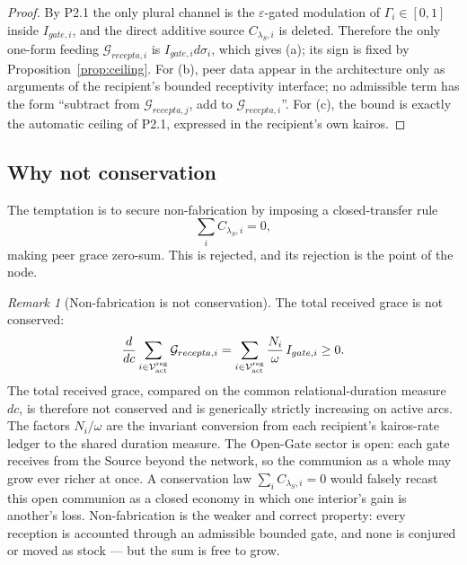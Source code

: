 \documentclass[11pt,a4paper]{article}
\def\mathfrak#1{#1}%
\def\mathrm#1{#1}%
\def\emph#1{#1}%
\theoremstyle{definition}
\theoremstyle{plain}
\theoremstyle{remark}
\newtheorem{remark}[definition]{Remark}
\begin{document}
\begin{proof}
By P2.1 the only plural channel is the \(\varepsilon\)-gated modulation of
\(\Gamma_i\in[0,1]\) inside \(I_{\mathrm{gate},i}\), and the direct additive source
\(C_{\lambda_S,i}\) is deleted. Therefore the only one-form feeding
\(\mathcal G_{\mathrm{recepta},i}\) is \(I_{\mathrm{gate},i}d\sigma_i\), which gives
(a); its sign is fixed by Proposition~\ref{prop:ceiling}. For (b), peer data appear
in the architecture only as arguments of the recipient's bounded receptivity
interface; no admissible term has the form ``subtract from
\(\mathcal G_{\mathrm{recepta},j}\), add to
\(\mathcal G_{\mathrm{recepta},i}\)''. For (c), the bound is exactly the automatic
ceiling of P2.1, expressed in the recipient's own kairos. \qedhere
\end{proof}

\subsection{Why not conservation}

The temptation is to secure non-fabrication by imposing a closed-transfer rule
\[
\sum_i C_{\lambda_S,i}=0,
\]
making peer grace zero-sum. This is rejected, and its rejection is the point of the node.

\begin{remark}[Non-fabrication is not conservation]\label{rem:notconservation}
The total received grace is \emph{not} conserved:
\[
\frac{d}{d\mathfrak c}
\sum_{i\in\mathcal V_{\rm act}^{\rm reg}}
\mathcal G_{\mathrm{recepta},i}
=
\sum_{i\in\mathcal V_{\rm act}^{\rm reg}}
\frac{N_i}{\omega}\,I_{\mathrm{gate},i}
\ge0.
\]
The total received grace, compared on the common relational-duration measure
\(d\mathfrak c\), is therefore not conserved and is generically strictly increasing
on active arcs. The factors \(N_i/\omega\) are the invariant conversion from each
recipient's kairos-rate ledger to the shared duration measure. The Open-Gate sector is
open: each gate receives from the
Source beyond the network, so the communion as a whole may grow ever richer at once. A
conservation law \(\sum_i C_{\lambda_S,i}=0\) would falsely recast this open communion as a
closed economy in which one interior's gain is another's loss. Non-fabrication is the
weaker and correct property: every reception is accounted through an admissible bounded
gate, and none is conjured or moved as stock --- but the sum is free to grow.
\end{remark}
\end{document}
